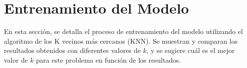 
\section{Entrenamiento del Modelo} \label{sec:Entrenamiento del Modelo}

En esta sección, se detalla el proceso de entrenamiento del modelo utilizando el algoritmo de los K vecinos más cercanos (KNN). Se muestran y comparan los resultados obtenidos con diferentes valores de $k$, y se sugiere cuál es el mejor valor de $k$ para este problema en función de los resultados.






